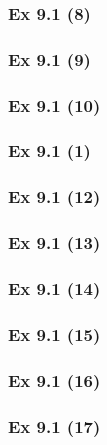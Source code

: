 \subsubsection{Ex 9.1 (8)}\label{sec:Ex_9.1.8}

\subsubsection{Ex 9.1 (9)}\label{sec:Ex_9.1.9}

\subsubsection{Ex 9.1 (10)}\label{sec:Ex_9.1.10}

\newpage		%

\subsubsection{Ex 9.1 (1)}\label{sec:Ex_9.1.11}

\subsubsection{Ex 9.1 (12)}\label{sec:Ex_9.1.12}

\subsubsection{Ex 9.1 (13)}\label{sec:Ex_9.1.13}

\subsubsection{Ex 9.1 (14)}\label{sec:Ex_9.1.14}

\subsubsection{Ex 9.1 (15)}\label{sec:Ex_9.1.15}

\subsubsection{Ex 9.1 (16)}\label{sec:Ex_9.1.16}

\subsubsection{Ex 9.1 (17)}\label{sec:Ex_9.1.17}

